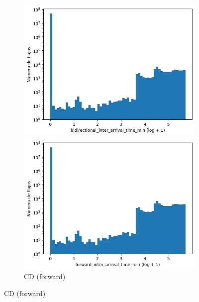 \begin{figure}[H]
    \centering
    \hfill
    \begin{subfigure}[b]{0.26\textwidth}
        \centering
        \includegraphics[width=\textwidth]{media/packet_pincer_cicddos/bidirectional_inter_arrival_time_min_log_x_log_y.png}
        \caption{CD (bidir.)}
        \includegraphics[width=\textwidth]{media/packet_pincer_cicddos/forward_inter_arrival_time_min_log_x_log_y.png}
        \caption{CD (forward)}

\end{subfigure}
\end{figure}
